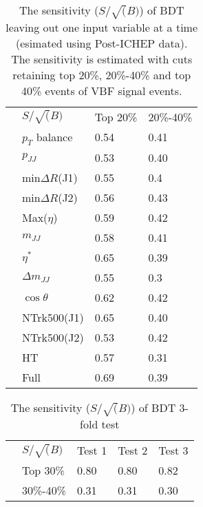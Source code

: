 \begin{table}[]
\centering
\caption{The sensitivity ($S/\sqrt(B)$) of \fourcentral BDT leaving out one input variable at a time (esimated using Post-ICHEP data). The sensitivity is estimated with cuts retaining top 20\%, 20\%-40\% and top 40\% events of VBF signal events.}
\label{tab:BDT-4cen-sensitivity}
\begin{tabular}{l|l|l|l|}
\cline{2-4}
 & $S/\sqrt(B)$      & Top 20\% & 20\%-40\% \\ \cline{2-4} 
 & $p_T$ balance     & 0.54     & 0.41      \\ \cline{2-4} 
 & $p_{JJ}$          & 0.53     & 0.40      \\ \cline{2-4} 
 & min$\Delta R$(J1) & 0.55     & 0.4       \\ \cline{2-4} 
 & min$\Delta R$(J2) & 0.56     & 0.43      \\ \cline{2-4} 
 & Max($\eta$)       & 0.59     & 0.42      \\ \cline{2-4} 
 & $m_{JJ}$          & 0.58     & 0.41      \\ \cline{2-4} 
 & $\eta^*$          & 0.65     & 0.39      \\ \cline{2-4} 
 & $\Delta m_{JJ}$   & 0.55     & 0.3       \\ \cline{2-4} 
 & $\cos{\theta}$    & 0.62     & 0.42      \\ \cline{2-4} 
 & NTrk500(J1)       & 0.65     & 0.40      \\ \cline{2-4} 
 & NTrk500(J2)       & 0.53     & 0.42      \\ \cline{2-4} 
 & HT                & 0.57     & 0.31      \\ \cline{2-4} 
 & Full              & 0.69     & 0.39      \\ \cline{2-4} 
\end{tabular}
\end{table}


\begin{table}[]
\centering
\caption{The sensitivity ($S/\sqrt(B)$) of \twocentral BDT 3-fold test}
\label{tab:BDT-2cen-kfold}
\begin{tabular}{l|l|l|l|l|}
\cline{2-5}
 & $S/\sqrt(B)$ & Test 1 & Test 2 & Test 3 \\ \cline{2-5} 
 & Top 30\%     & 0.80   & 0.80   & 0.82   \\ \cline{2-5} 
 & 30\%-40\%    & 0.31   & 0.31   & 0.30   \\ \cline{2-5} 
\end{tabular}
\end{table}


